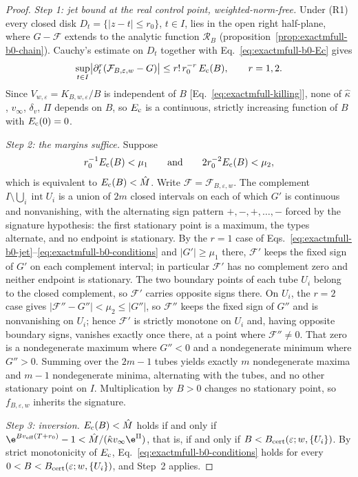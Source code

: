 \begin{proof}
\emph{Step 1: jet bound at the real control point, weighted-norm-free.}
Under (R1) every closed disk \(D_t=\{|z-t|\le r_0\}\), \(t\in I\), lies in
the open right half-plane, where \(G-\mathcal F\) extends to the analytic
function \(\mathcal R_B\)
(proposition~\ref{prop:exactmfull-b0-chain}).  Cauchy's estimate on
\(D_t\) together with Eq.~\eqref{eq:exactmfull-b0-Ec} gives
\begin{equation}
 \sup_{t\in I}
 \bigl|\partial_t^r(\mathcal F_{B,\varepsilon,w}-G)\bigr|
 \le r!\,r_0^{-r}\,E_{\rm c}(B),
 \qquad r=1,2.
 \label{eq:exactmfull-b0-jet}
\end{equation}
Since \(V_{w,\varepsilon}=K_{B,w,\varepsilon}/B\) is independent of \(B\)
[Eq.~\eqref{eq:exactmfull-killing}], none of \(\hat\kappa\), \(v_\infty\),
\(\delta_v\), \(\Pi\) depends on \(B\), so \(E_{\rm c}\) is a continuous,
strictly increasing function of \(B\) with \(E_{\rm c}(0)=0\).

\emph{Step 2: the margins suffice.}
Suppose
\begin{equation}
 r_0^{-1}E_{\rm c}(B)<\mu_1
 \qquad\text{and}\qquad
 2r_0^{-2}E_{\rm c}(B)<\mu_2,
 \label{eq:exactmfull-b0-conditions}
\end{equation}
which is equivalent to \(E_{\rm c}(B)<\hat M\).  Write
\(\mathcal F=\mathcal F_{B,\varepsilon,w}\).  The complement
\(I\setminus\bigcup_i\operatorname{int}U_i\) is a union of \(2m\) closed
intervals on each of which \(G'\) is continuous and nonvanishing, with the
alternating sign pattern \(+,-,+,\ldots,-\) forced by the signature
hypothesis: the first stationary point is a maximum, the types alternate,
and no endpoint is stationary.  By the \(r=1\) case of
Eqs.~\eqref{eq:exactmfull-b0-jet}--\eqref{eq:exactmfull-b0-conditions} and
\(|G'|\ge\mu_1\) there, \(\mathcal F'\) keeps the fixed sign of \(G'\) on
each complement interval; in particular \(\mathcal F'\) has no complement
zero and neither endpoint is stationary.  The two boundary points of each
tube \(U_i\) belong to the closed complement, so \(\mathcal F'\) carries
opposite signs there.  On \(U_i\), the \(r=2\) case gives
\(|\mathcal F''-G''|<\mu_2\le|G''|\), so \(\mathcal F''\) keeps the fixed
sign of \(G''\) and is nonvanishing on \(U_i\); hence \(\mathcal F'\) is
strictly monotone on \(U_i\) and, having opposite boundary signs, vanishes
exactly once there, at a point where \(\mathcal F''\ne0\).  That zero is a
nondegenerate maximum where \(G''<0\) and a nondegenerate minimum where
\(G''>0\).  Summing over the \(2m-1\) tubes yields exactly \(m\)
nondegenerate maxima and \(m-1\) nondegenerate minima, alternating with the
tubes, and no other stationary point on \(I\).  Multiplication by \(B>0\)
changes no stationary point, so \(f_{B,\varepsilon,w}\) inherits the
signature.

\emph{Step 3: inversion.}
\(E_{\rm c}(B)<\hat M\) holds if and only if
\(\e^{Bv_{\rm eff}(T+r_0)}-1<\hat M/(\hat\kappa v_\infty\e^{\Pi})\), that
is, if and only if
\(B<B_{\rm cert}(\varepsilon;w,\{U_i\})\).  By strict
monotonicity of \(E_{\rm c}\),
Eq.~\eqref{eq:exactmfull-b0-conditions} holds for every
\(0<B<B_{\rm cert}(\varepsilon;w,\{U_i\})\), and Step~2 applies.
\end{proof}

